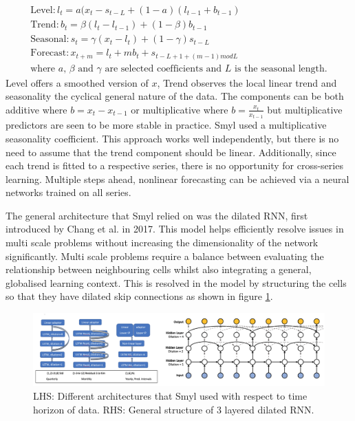 \documentclass[10pt,onecolumn,letterpaper]{article}
\begin{document}
\vskip -0.5cm
\begin{gather*}
 	\text{Level}: l_{t} = a(x_{t}-s_{t-L}+(1-a)(l_{t-1}+b_{t-1}) \\
	\text{Trend}: b_{t} =  \beta(l_{t}-l_{t-1})+(1-\beta)b_{t-1} \\
	\text{Seasonal}: s_{t} =  \gamma(x_{t}-l_{t})+(1-\gamma)s_{t-L} \\
	\text{Forecast}: x_{t+m} =  l_{t} + mb_{t} + s_{t-L+1+(m-1)modL} \\
	\text{where $a$, $\beta$ and $\gamma$ are selected coefficients and $L$ is the seasonal length.}
\end{gather*}
Level offers a smoothed version of $x$, Trend observes the local linear trend and seasonality the cyclical general nature of the data. The components can be both additive where $b = x_{t}-x_{t-1}$ or multiplicative where $b = \frac{x_{t}}{x_{t-1}}$ but multiplicative predictors are seen to be more stable in practice. Smyl used a multiplicative seasonality coefficient. This approach works well independently, but there is no need to assume that the trend component should be linear. Additionally, since each trend is fitted to a respective series, there is no opportunity for cross-series learning. Multiple steps ahead, nonlinear forecasting can be achieved via a neural networks trained on all series. 

The general architecture that Smyl relied on was the dilated RNN, first introduced by Chang et al. in 2017. This model helps efficiently resolve issues in multi scale problems without increasing the dimensionality of the network significantly. Multi scale problems require a balance between evaluating the relationship between neighbouring cells whilst also integrating a general, globalised learning context. This is resolved in the model by structuring the cells so that they have dilated skip connections as shown in figure \ref{chang_architecture}. 


\begin{figure}[!hbt!]
\centering
\includegraphics[width=14.5cm]{smyl_architecture.png}
\caption{LHS: Different architectures that Smyl used with respect to time horizon of data. RHS: General structure of 3 layered dilated RNN.}
\label{chang_architecture}
\end{figure}
\end{document}
